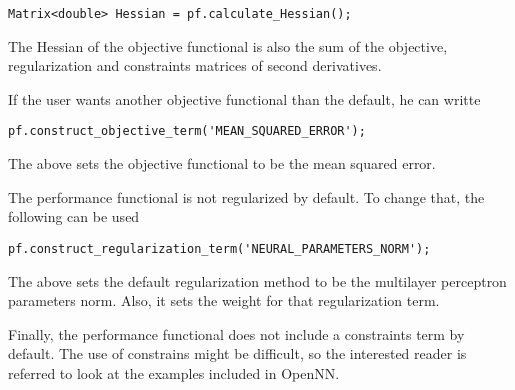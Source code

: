 \begin{lstlisting}
Matrix<double> Hessian = pf.calculate_Hessian();
\end{lstlisting}

The Hessian of the objective functional is also the sum of the objective, regularization and constraints matrices of second derivatives. 


If the user wants another objective functional than the default, he can writte

\begin{lstlisting}
pf.construct_objective_term('MEAN_SQUARED_ERROR');
\end{lstlisting}

The above sets the objective functional to be the mean squared error. 


The performance functional is not regularized by default. 
To change that, the following can be used

\begin{lstlisting}
pf.construct_regularization_term('NEURAL_PARAMETERS_NORM');
\end{lstlisting}

The above sets the default regularization method to be the multilayer perceptron parameters norm. 
Also, it sets the weight for that regularization term. 


Finally, the performance functional does not include a constraints term by default. 
The use of constrains might be difficult, so the interested reader is referred to look at the examples included in OpenNN.  



